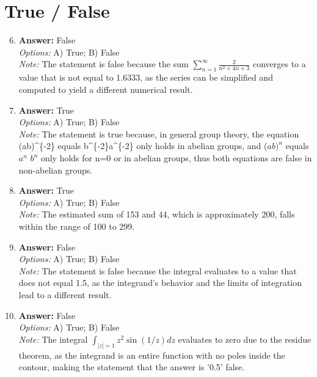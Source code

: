 \documentclass[12pt]{article}
\begin{document}
\section*{True / False}
\begin{enumerate}[label=\arabic*.]
\setcounter{enumi}{5}
\item \textbf{Answer:} False
\\ \textit{Options:} A) True; B) False
\\ \textit{Note:} The statement is false because the sum $\sum_{n=1}^{\infty} \frac{2}{n^2 + 4 n + 3}$ converges to a value that is not equal to 1.6333, as the series can be simplified and computed to yield a different numerical result.
\item \textbf{Answer:} True
\\ \textit{Options:} A) True; B) False
\\ \textit{Note:} The statement is true because, in general group theory, the equation (ab)^\{-2\} equals b^\{-2\}a^\{-2\} only holds in abelian groups, and ($ab)^n$ equals $a^n$ $b^n$ only holds for n=0 or in abelian groups, thus both equations are false in non-abelian groups.
\item \textbf{Answer:} True
\\ \textit{Options:} A) True; B) False
\\ \textit{Note:} The estimated sum of 153 and 44, which is approximately 200, falls within the range of 100 to 299.
\item \textbf{Answer:} False
\\ \textit{Options:} A) True; B) False
\\ \textit{Note:} The statement is false because the integral evaluates to a value that does not equal 1.5, as the integrand's behavior and the limits of integration lead to a different result.
\item \textbf{Answer:} False
\\ \textit{Options:} A) True; B) False
\\ \textit{Note:} The integral $\int_{|z| = 1} z^2 \sin(1/z) dz$ evaluates to zero due to the residue theorem, as the integrand is an entire function with no poles inside the contour, making the statement that the answer is '0.5' false.
\end{enumerate}
\end{document}
